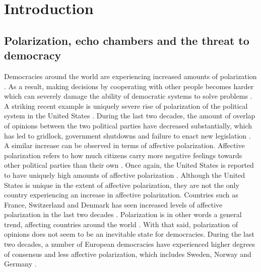 \documentclass{article}
\begin{document}
\tableofcontents
\newpage
\section{Introduction}

\subsection{Polarization, echo chambers and the threat to democracy}

Democracies around the world are experiencing increased amounts of polarization \cite{boxell_cross-country_2020,mccoy_polarization_2018, somer_deja_2018}. As a result, making decisions by cooperating with other people becomes harder which can severely damage the ability of democratic systems to solve problems \cite{andris_rise_2015,levin_dynamics_2021,mccoy_polarization_2018}. A striking recent example is uniquely severe rise of polarization of the political system in the United States \cite{dimock_america_2020}. During the last two decades, the amount of overlap of opinions between the two political parties have decreased substantially, which has led to gridlock, government shutdowns and failure to enact new legislation \cite{andris_rise_2015, pew_research_center_political_2014-1}. A similar increase can be observed in terms of affective polarization. Affective polarization refers to how much citizens carry more negative feelings towards other political parties than their own \cite{boxell_cross-country_2020, iyengar_origins_2019}. Once again, the United States is reported to have uniquely high amounts of affective polarization \cite{boxell_cross-country_2020}. Although the United States is unique in the extent of affective polarization, they are not the only country experiencing an increase in affective polarization. Countries such as France, Switzerland and Denmark has seen increased levels of affective polarization in the last two decades \cite{boxell_cross-country_2020}. Polarization is in other words a general trend, affecting countries around the world \cite{mccoy_polarization_2018, somer_deja_2018, wilson_polarization_2020}. With that said, polarization of opinions does not seem to be an inevitable state for democracies. During the last two decades, a number of European democracies have experienced higher degrees of consensus and less affective polarization, which includes Sweden, Norway and Germany \cite{boxell_cross-country_2020}. 
\end{document}
